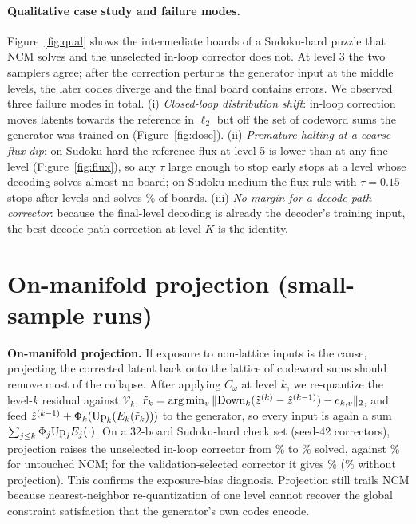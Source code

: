 \paragraph{Qualitative case study and failure modes.}
Figure~\ref{fig:qual} shows the intermediate boards of a Sudoku-hard puzzle that NCM solves and the unselected in-loop corrector does not. At level 3 the two samplers agree; after the correction perturbs the generator input at the middle levels, the later codes diverge and the final board contains errors. We observed three failure modes in total. (i) \emph{Closed-loop distribution shift}: in-loop correction moves latents towards the reference in $\ell_2$ but off the set of codeword sums the generator was trained on (Figure~\ref{fig:dose}). (ii) \emph{Premature halting at a coarse flux dip}: on Sudoku-hard the reference flux at level 5 is lower than at any fine level (Figure~\ref{fig:flux}), so any $\tau$ large enough to stop early stops at a level whose decoding solves almost no board; on Sudoku-medium the flux rule with $\tau=0.15$ stops after \ZsFluxFifteenLevMedium{} levels and solves \ZsFluxFifteenMedium\% of boards. (iii) \emph{No margin for a decode-path corrector}: because the final-level decoding is already the decoder's training input, the best decode-path correction at level $K$ is the identity.

\section{On-manifold projection (small-sample runs)}
\label{app:proj}
\textbf{On-manifold projection.} If exposure to non-lattice inputs is the cause, projecting the corrected latent back onto the lattice of codeword sums should remove most of the collapse. After applying $C_\omega$ at level $k$, we re-quantize the level-$k$ residual against $\mathcal{V}_k$, $\tilde r_k=\arg\min_v\|\mathrm{Down}_k(\tilde{z}^{(k)}-\hat{z}^{(k-1)})-e_{k,v}\|_2$, and feed $\hat{z}^{(k-1)}+\Phi_k(\mathrm{Up}_k(E_k(\tilde r_k)))$ to the generator, so every input is again a sum $\sum_{j\le k}\Phi_j\mathrm{Up}_jE_j(\cdot)$. On a 32-board Sudoku-hard check set (seed-42 correctors), projection raises the unselected in-loop corrector from \ProjNoSelOff\% to \ProjNoSelOn\% solved, against \ProjNCM\% for untouched NCM; for the validation-selected corrector it gives \ProjSelOn\% (\ProjSelOff\% without projection). This confirms the exposure-bias diagnosis. Projection still trails NCM because nearest-neighbor re-quantization of one level cannot recover the global constraint satisfaction that the generator's own codes encode.

